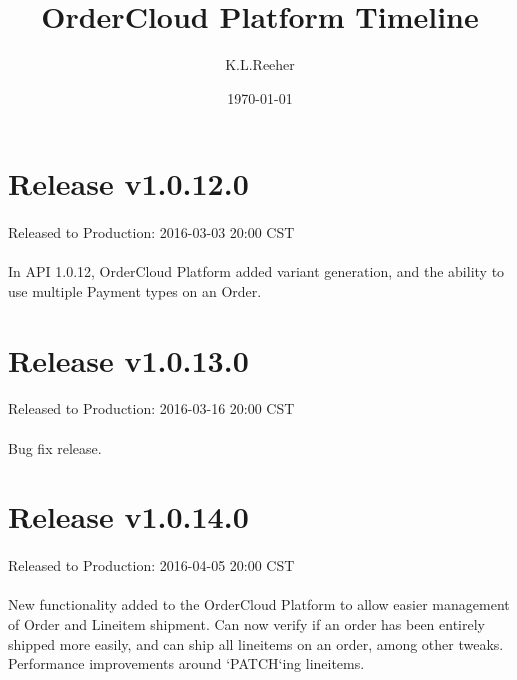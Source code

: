 \documentclass{memoir}%
\title{OrderCloud Platform Timeline}%
\author{K.L.Reeher}%
\date{\today}%
\begin{document}
%
\normalsize%
\maketitle%
\section*{Release v1.0.12.0}%
\paragraph*{}%
Released to Production: 2016{-}03{-}03 20:00 CST

%
\paragraph*{}%
In API 1.0.12, OrderCloud Platform added variant generation, and the ability to use multiple Payment types on an Order.

%
\section*{Release v1.0.13.0}%
\paragraph*{}%
Released to Production: 2016{-}03{-}16 20:00 CST

%
\paragraph*{}%
Bug fix release.

%
\section*{Release v1.0.14.0}%
\paragraph*{}%
Released to Production: 2016{-}04{-}05 20:00 CST

%
\paragraph*{}%
New functionality added to the OrderCloud Platform to allow easier management of Order and Lineitem shipment. Can now verify if an order has been entirely shipped more easily, and can ship all lineitems on an order, among other tweaks. Performance improvements around `PATCH`ing lineitems.
\end{document}
